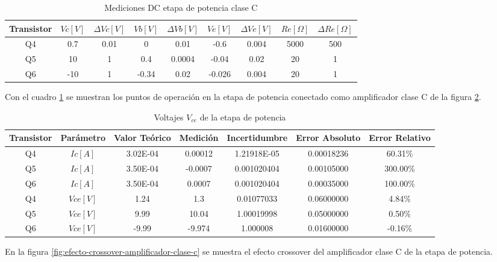 \begin{table}[h!]
\centering
\begin{tabular}{|c|c|c|c|c|c|c|c|c|}
\hline
\textbf{Transistor} & \textbf{\(Vc[V]\)} & \textbf{\(\varDelta Vc[V]\)} & \textbf{\(Vb[V]\)} & \textbf{\(\varDelta Vb[V]\)} & \textbf{\(Ve[V]\)} & \textbf{\(\varDelta Ve[V]\)} & \textbf{\(Re[\Omega]\)} & \textbf{\(\varDelta Re[\Omega]\)} \\ \hline
Q4 & 0.7 & 0.01 & 0 & 0.01 & -0.6 & 0.004 & 5000 & 500 \\ \hline
Q5 & 10 & 1 & 0.4 & 0.0004 & -0.04 & 0.02 & 20 & 1 \\ \hline
Q6 & -10 & 1 & -0.34 & 0.02 & -0.026 & 0.004 & 20 & 1 \\ \hline
\end{tabular}
\caption{Mediciones DC etapa de potencia clase C}
\label{tab:med-dc-etapa-potencia-clase-c}
\end{table}

Con el cuadro \ref{tab:med-dc-etapa-potencia-clase-c} se muestran los puntos de operación en la etapa de potencia conectado como amplificador clase C de la figura \ref{tab:med-punto-estatico-etapa-potencia-clase-c}.

\begin{table}[h!]
\centering
\begin{tabular}{|c|c|c|c|c|c|c|}
\hline
\textbf{Transistor} & \textbf{Parámetro} & \textbf{Valor Teórico} & \textbf{Medición} & \textbf{Incertidumbre} & \textbf{Error Absoluto} & \textbf{Error Relativo} \\ \hline
Q4 & \(Ic [A]\) & 3.02E-04 & 0.00012 & 1.21918E-05 & 0.00018236 & 60.31\% \\ \hline
Q5 & \(Ic [A]\) & 3.50E-04 & -0.0007 & 0.001020404 & 0.00105000 & 300.00\% \\ \hline
Q6 & \(Ic [A]\) & 3.50E-04 & 0.0007 & 0.001020404 & 0.00035000 & 100.00\% \\ \hline
Q4 & \(Vce [V]\) & 1.24 & 1.3 & 0.01077033 & 0.06000000 & 4.84\% \\ \hline
Q5 & \(Vce [V]\) & 9.99 & 10.04 & 1.00019998 & 0.05000000 & 0.50\% \\ \hline
Q6 & \(Vce [V]\) & -9.99 & -9.974 & 1.000008 & 0.01600000 & -0.16\% \\ \hline
\end{tabular}
\caption{Voltajes \(V_{ce}\) de la etapa de potencia}
\label{tab:med-punto-estatico-etapa-potencia-clase-c}
\end{table}

En la figura \ref{fig:efecto-crossover-amplificador-clase-c} se muestra el efecto crossover del amplificador clase C de la etapa de potencia.

